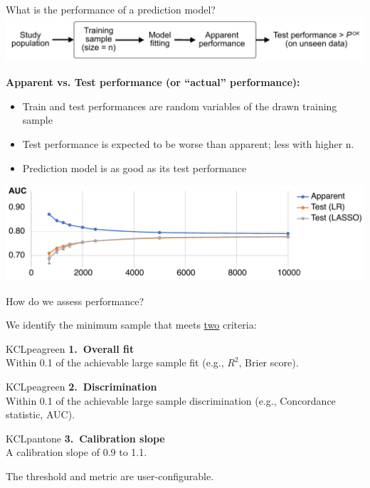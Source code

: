 \documentclass[11pt]{beamer}
\begin{document}
\begin{frame}[t]{What is the performance of a prediction model?}
	\includegraphics[width=\textwidth]{figures/performance_flow.pdf}%

	\textbf{Apparent vs. Test performance (or ``actual'' performance):}

	\begin{itemize}
		\item Train and test performances are random variables of the drawn
		      training sample
		\item Test performance is expected to be worse than apparent; less
		      with higher n.
		\item Prediction model is as good as its test performance
	\end{itemize}

	\includegraphics[width=\textwidth]{figures/diana-auc.pdf}%
\end{frame}

\begin{frame}[t]{How do we assess performance?}

	We identify the minimum sample that meets \underline{two} criteria:

	\begin{cbox}{KCLpeagreen}{}
		{\large
			\textbf{1.\ Overall fit} \\
			Within 0.1 of the achievable large sample fit (e.g., $R^2$, Brier score).
        }
	\end{cbox}

	\begin{cbox}{KCLpeagreen}{}
		{\large
			\textbf{2.\ Discrimination} \\
			Within 0.1 of the achievable large sample discrimination (e.g., Concordance statistic, AUC).
        }
	\end{cbox}

	\begin{cbox}{KCLpantone}{}
		{\large
			\textbf{3.\ Calibration slope} \\

			A calibration slope of 0.9 to 1.1.}
	\end{cbox}

	The threshold and metric are user-configurable.

\end{frame}
\end{document}
